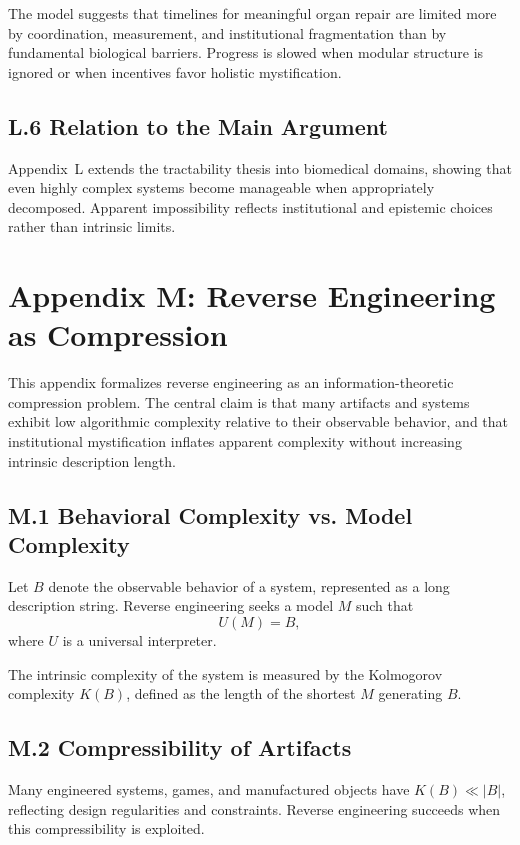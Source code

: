 \documentclass[11pt]{article}
\begin{document}
The model suggests that timelines for meaningful organ repair are limited more by coordination, measurement, and institutional fragmentation than by fundamental biological barriers. Progress is slowed when modular structure is ignored or when incentives favor holistic mystification.

\subsection{L.6 Relation to the Main Argument}

Appendix~L extends the tractability thesis into biomedical domains, showing that even highly complex systems become manageable when appropriately decomposed. Apparent impossibility reflects institutional and epistemic choices rather than intrinsic limits.

\section{Appendix M: Reverse Engineering as Compression}
\label{app:compression-detailed}

This appendix formalizes reverse engineering as an information-theoretic compression problem. The central claim is that many artifacts and systems exhibit low algorithmic complexity relative to their observable behavior, and that institutional mystification inflates apparent complexity without increasing intrinsic description length.

\subsection{M.1 Behavioral Complexity vs. Model Complexity}

Let \(B\) denote the observable behavior of a system, represented as a long description string. Reverse engineering seeks a model \(M\) such that
\[
U(M) = B,
\]
where \(U\) is a universal interpreter.

The intrinsic complexity of the system is measured by the Kolmogorov complexity \(K(B)\), defined as the length of the shortest \(M\) generating \(B\).

\subsection{M.2 Compressibility of Artifacts}

Many engineered systems, games, and manufactured objects have \(K(B) \ll |B|\), reflecting design regularities and constraints. Reverse engineering succeeds when this compressibility is exploited.
\end{document}
